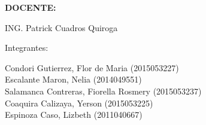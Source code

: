 \documentclass[12pt,letterpaper]{article}
\begin{document}
\begin{titlepage}
\begin{center}
\vspace*{0.3in}
\begin{Large}
\textbf{DOCENTE:} \\
\end{Large}

\vspace*{0.1in}
\begin{large}
 ING. Patrick Cuadros Quiroga\\
\end{large}

\vspace*{0.2in}
\vspace*{0.1in}
\begin{large}
Integrantes: \\
\vspace{\baselineskip}
\begin{flushleft}
Condori Gutierrez, Flor de Maria            	\hfill	(2015053227) \\
Escalante Maron,  Nelia            	\hfill	(2014049551) \\
Salamanca Contreras, Fiorella Rosmery           	\hfill	(2015053237) \\
Coaquira Calizaya, Yerson      	\hfill	(2015053225) \\
Espinoza Caso, Lizbeth  		\hfill	(2011040667) \\
\end{flushleft}
\end{large}
\end{center}

\end{titlepage}

\tableofcontents %
\thispagestyle{empty} %
\newpage
\setcounter{page}{1} %





\end{document}
